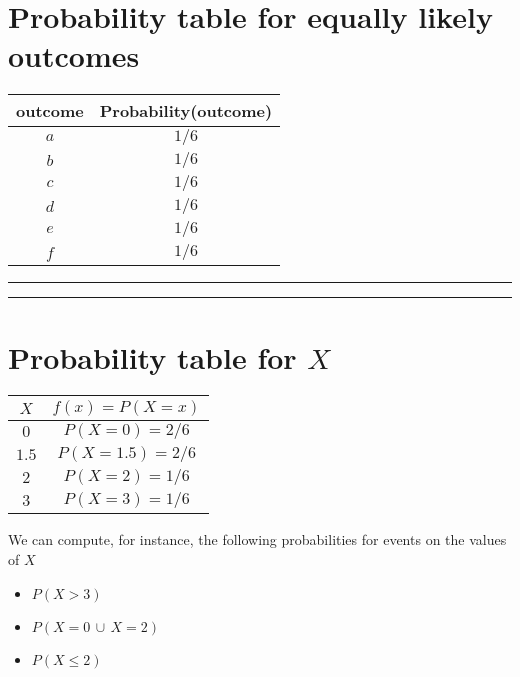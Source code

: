 \documentclass[
]{book}
\providecommand{\tightlist}{%
  \setlength{\itemsep}{0pt}\setlength{\parskip}{0pt}}
\begin{document}
\hypertarget{probability-table-for-equally-likely-outcomes}{%
\section{Probability table for equally likely outcomes}\label{probability-table-for-equally-likely-outcomes}}

\begin{longtable}[]{@{}cc@{}}
\toprule
outcome & Probability(outcome) \\
\midrule
\endhead
\(a\) & \(1/6\) \\
\(b\) & \(1/6\) \\
\(c\) & \(1/6\) \\
\(d\) & \(1/6\) \\
\(e\) & \(1/6\) \\
\(f\) & \(1/6\) \\
\bottomrule
\end{longtable}

\begin{center}\rule{0.5\linewidth}{0.5pt}\end{center}

\begin{center}\rule{0.5\linewidth}{0.5pt}\end{center}

\hypertarget{probability-table-for-x}{%
\section{\texorpdfstring{Probability table for \(X\)}{Probability table for X}}\label{probability-table-for-x}}

\begin{longtable}[]{@{}cc@{}}
\toprule
\(X\) & \(f(x)=P(X=x)\) \\
\midrule
\endhead
\(0\) & \(P(X=0)=2/6\) \\
\(1.5\) & \(P(X=1.5)=2/6\) \\
\(2\) & \(P(X=2)=1/6\) \\
\(3\) & \(P(X=3)=1/6\) \\
\bottomrule
\end{longtable}

We can compute, for instance, the following probabilities for events on the values of \(X\)

\begin{itemize}
\tightlist
\item
  \(P(X>3)\)
\item
  \(P(X=0\, \cup \, X=2 )\)
\item
  \(P(X \leq 2)\)
\end{itemize}
\end{document}
